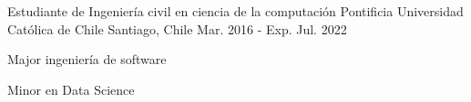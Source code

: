 

\begin{cventries}

  \cventry
    {Estudiante de Ingeniería civil en ciencia de la computación} %
    {Pontificia Universidad Católica de Chile} %
    {Santiago, Chile} %
    {Mar. 2016 - Exp. Jul. 2022} %
    {
      \begin{cvitems} %
        \item {Major ingeniería de software}
        \item {Minor en Data Science}
      \end{cvitems}
    }

\end{cventries}
